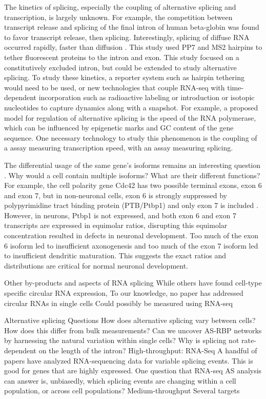 The kinetics of splicing, especially the coupling of alternative splicing and transcription, is largely unknown. For example, the competition between transcript release and splicing of the final intron of human beta-globin was found to favor transcript release, then splicing. Interestingly, splicing of diffuse RNA occurred rapidly, faster than diffusion \cite{Coulon2014-he}. This study used PP7 and MS2 hairpins to tether fluorescent proteins to the intron and exon. This study focused on a constitutively excluded intron, but could be extended to study alternative splicing. To study these kinetics, a reporter system such as hairpin tethering would need to be used, or new technologies that couple RNA-seq with time-dependent incorporation such as radioactive labeling or introduction or isotopic nucleotides to capture dynamics along with a snapshot. For example, a proposed model for regulation of alternative splicing is the speed of the RNA polymerase, which can be influenced by epigenetic marks and GC content of the gene sequence. One necessary technology to study this phenomenon is the coupling of a assay measuring transcription speed, with an assay measuring splicing. 

The differential usage of the same gene's isoforms remains an interesting question \cite{Yap:2016ig}. Why would a cell contain multiple isoforms? What are their different functions? For example, the cell polarity gene Cdc42 has two possible terminal exons, exon 6 and exon 7, but in non-neuronal cells, exon 6 is strongly suppressed by polypyrimidine tract binding protein (PTB/Ptbp1) and only exon 7 is included \cite{Yap:2016bs}. However, in neurons, Ptbp1 is not expressed, and both exon 6 and exon 7 transcripts are expressed in equimolar ratios, disrupting this equimolar concentration resulted in defects in neuronal development. Too much of the exon 6 isoform led to insufficient axonogenesis and too much of the exon 7 isoform led to insufficient dendritic maturation. This suggests the exact ratios and distributions are critical for normal neuronal development.

Other by-products and aspects of RNA splicing
While others have found cell-type specific circular RNA \cite{Salzman2013-ol} expression, To our knowledge, no paper has addressed circular RNAs in single cells
Could possibly be measured using RNA-seq

Alternative splicing
Questions
How does alternative splicing vary between cells? 
How does this differ from bulk measurements? 
Can we uncover AS-RBP networks by harnessing the natural variation within single cells?
Why is splicing not rate-dependent on the length of the intron?
High-throughput: RNA-Seq
A handful of papers have analyzed RNA-sequencing data for variable splicing events.
This is good for genes that are highly expressed.
One question that RNA-seq AS analysis can answer is, unbiasedly, which splicing events are changing within a cell population, or across cell populations?
Medium-throughput
Several targets 

